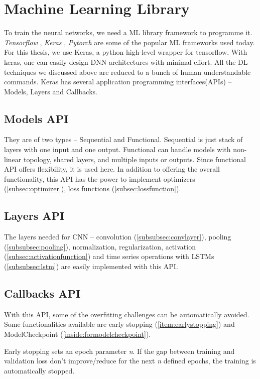 \section{Machine Learning Library}
To train the neural networks, we need a ML library framework to programme it. \textit{Tensorflow}
\cite{tensorflow},
\textit{Keras} \cite{Keras}, \textit{Pytorch} \cite{pyTorch} are some of the popular ML
frameworks used today.
For this thesis, we use Keras, a python high-level wrapper for tensorflow. With keras, one
can easily design DNN architectures with minimal effort. All the DL techniques we
discussed above are reduced to a bunch of human understandable commands.
Keras has several application programming interfaces(APIs) -- Models, Layers and
Callbacks.
\subsection{Models API}
\label{subsec:modelsapi}
They are of two types -- Sequential and Functional. Sequential is just stack of layers
with one input and one output. Functional can handle models with non-linear topology,
shared layers, and multiple inputs or outputs. Since functional API offers flexibility, it
is used here.
In addition to offering the overall functionality, this API has the power to implement
optimizers (\ref{subsec:optimizer}), loss functions (\ref{subsec:lossfunction}).

\subsection{Layers API}
The layers needed for CNN -- convolution (\ref{subsubsec:convlayer}), pooling
(\ref{subsubsec:pooling}), normalization, regularization,
activation (\ref{subsec:activationfunction}) and time series operations with LSTMs
(\ref{subsubsec:lstm}) are easily implemented with this API.

\subsection{Callbacks API}
With this API, some of the overfitting challenges can be automatically avoided.
Some functionalities available are early stopping (\ref{item:earlystopping}) and
ModelCheckpoint (\ref{inside:formodelcheckpoint}).

Early stopping sets an epoch parameter \textit{n}. If the gap between training and validation loss
don't improve/reduce for the next \textit{n} defined epochs, the training is automatically
stopped.

